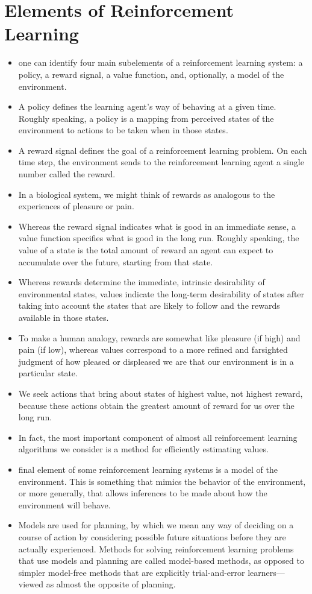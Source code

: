 \documentclass{article}
\begin{document}
\section{Elements of Reinforcement Learning}
\begin{itemize}
    \item one can identify four main subelements of a reinforcement learning system: a policy, a reward signal, a value function, and, optionally, a model of the environment.
    \item A policy defines the learning agent's way of behaving at a given time. Roughly speaking, a policy is a mapping from perceived states of the environment to actions to be taken when in those states.
    \item A reward signal defines the goal of a reinforcement learning problem. On each time step, the environment sends to the reinforcement learning agent a single number called the reward.
    \item In a biological system, we might think of rewards as analogous to the experiences of pleasure or pain.
    \item Whereas the reward signal indicates what is good in an immediate sense, a value function specifies what is good in the long run. Roughly speaking, the value of a state is the total amount of reward an agent can expect to accumulate over the future, starting from that state.
    \item Whereas rewards determine the immediate, intrinsic desirability of environmental states, values indicate the long-term desirability of states after taking into account the states that are likely to follow and the rewards available in those states.
    \item To make a human analogy, rewards are somewhat like pleasure (if high) and pain (if low), whereas values correspond to a more refined and farsighted judgment of how pleased or displeased we are that our environment is in a particular state.
    \item We seek actions that bring about states of highest value, not highest reward, because these actions obtain the greatest amount of reward for us over the long run.
    \item In fact, the most important component of almost all reinforcement learning algorithms we consider is a method for efficiently estimating values.
    \item final element of some reinforcement learning systems is a model of the environment. This is something that mimics the behavior of the environment, or more generally, that allows inferences to be made about how the environment will behave.
    \item Models are used for planning, by which we mean any way of deciding on a course of action by considering possible future situations before they are actually experienced. Methods for solving reinforcement learning problems that use models and planning are called model-based methods, as opposed to simpler model-free methods that are explicitly trial-and-error learners—viewed as almost the opposite of planning.
\end{itemize}
\end{document}
